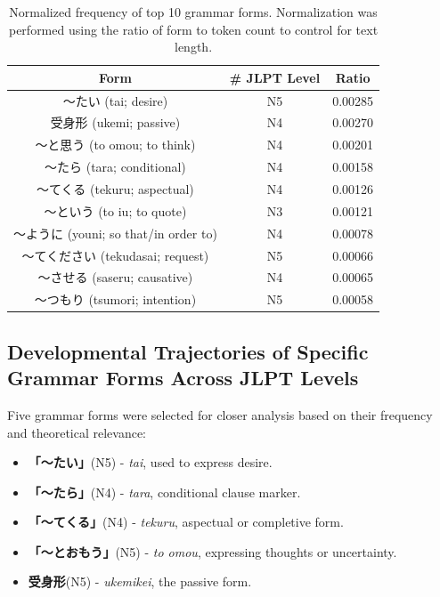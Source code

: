\begin{table}[h!]
\centering
\begin{tabular}{ccc}
\hline \textbf{Form} & \textbf{\# JLPT Level} & \textbf{Ratio} \\ \hline
〜たい (tai; desire)                      & N5 & 0.00285 \\
受身形 (ukemi; passive)                  & N4 & 0.00270 \\
〜と思う (to omou; to think)             & N4 & 0.00201 \\
〜たら (tara; conditional)               & N4 & 0.00158 \\
〜てくる (tekuru; aspectual)             & N4 & 0.00126 \\
〜という (to iu; to quote)               & N3 & 0.00121 \\
〜ように (youni; so that/in order to)    & N4 & 0.00078 \\
〜てください (tekudasai; request)        & N5 & 0.00066 \\
〜させる (saseru; causative)             & N4 & 0.00065 \\
〜つもり (tsumori; intention)            & N5 & 0.00058 \\
\hline
\end{tabular}
\caption[Top 10 Grammar forms by normalized token ratio extracted from the I-JAS Corpus]{Normalized frequency of top
10 grammar forms. Normalization was performed using the ratio of form to token count to control for text length. }
\label{tab:CF-form-freq-ratio}
\end{table}

\subsection{Developmental Trajectories of Specific Grammar Forms Across JLPT Levels}

Five grammar forms were selected for closer analysis based on their frequency and theoretical relevance:

\begin{itemize}
\item \textbf{「〜たい」}(N5) - \textit{tai}, used to express desire.
\item \textbf{「〜たら」}(N4) - \textit{tara}, conditional clause marker.
\item \textbf{「〜てくる」}(N4) - \textit{tekuru}, aspectual or completive form.
\item \textbf{「〜とおもう」}(N5) - \textit{to omou}, expressing thoughts or uncertainty.
\item \textbf{受身形}(N5) - \textit{ukemikei}, the passive form.
\end{itemize}

